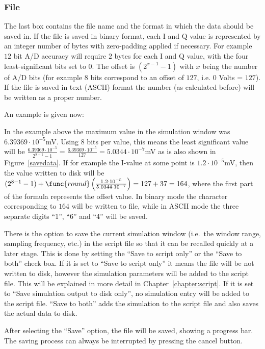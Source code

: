 \subsubsection{File}

The last box contains the file name and the format in which the data should
be saved in. If the file is saved in binary format, each I and Q value is
represented by an integer number of bytes with zero-padding applied if
necessary. For example $12$ bit A/D accuracy will require $2$ bytes for each
I and Q value, with the four least-significant bits set to $0$. The offset
is $\left( 2^{x-1}-1\right) $ with $x$ being the number of A/D bits (for
example $8$ bits correspond to an offset of $127$, i.e. $0$ Volts = $127$).
If the file is saved in text (ASCII) format the number (as calculated
before) will be written as a proper number.

An example is given now:

In the example above the maximum value in the simulation window was $%
6.39369\cdot 10^{-5}$\thinspace mV. Using $8$ bits per value, this means the
least significant value will be $\frac{6.39369\cdot 10^{-5}}{2^{8-1}-1}=%
\frac{6.39369\cdot 10^{-5}}{127}=5.0344\cdot 10^{-7}$\thinspace mV as is
also shown in Figure~\ref{savedata}. If for example the I-value at some
point is $1.2\cdot 10^{-5}$\thinspace mV, then the value written to disk
will be $(2^{8-1}-1)+\func{round}\left( \frac{1.2\cdot 10^{-5}}{5.0344\cdot
10^{-7}}\right) =127+37=164$, where the first part of the formula represents
the offset value. In binary mode the character corresponding to $164$ will
be written to file, while in ASCII mode the three separate digits ``1'',
``6'' and ``4'' will be saved.

There is the option to save the current simulation window (i.e.~the window
range, sampling frequency, etc.) in the script file so that it can be
recalled quickly at a later stage. This is done by setting the ``Save to
script only'' or the ``Save to both'' check box. If it is set to ``Save to
script only'' it means the file will be not written to disk, however the
simulation parameters will be added to the script file. This will be
explained in more detail in Chapter~\ref{chapter:script}. If it is set to
``Save simulation output to disk only'', no simulation entry will be added
to the script file. ``Save to both'' adds the simulation to the script file
and also saves the actual data to disk.

After selecting the ``Save'' option, the file will be saved, showing a
progress bar. The saving process can always be interrupted by pressing the
cancel button.

